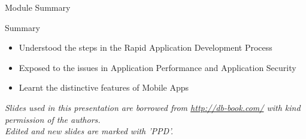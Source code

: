 \documentclass[aspectratio=169, xcolor=dvipsnames]{beamer}
\begin{document}
\begin{frame}{Module Summary}
    \begin{block}{Summary}
        \begin{itemize}[<+->]
            \item Understood the steps in the Rapid Application Development Process
            \item Exposed to the issues in Application Performance and Application Security
            \item Learnt the distinctive features of Mobile Apps
        \end{itemize}
    \end{block}
    \vspace{2em}
    \begin{center}
    \small \textit{Slides used in this presentation are borrowed from \url{http://db-book.com/} with kind permission of the authors.} \\
    \small \textit{Edited and new slides are marked with 'PPD'.}
    \end{center}
\end{frame}
\end{document}
